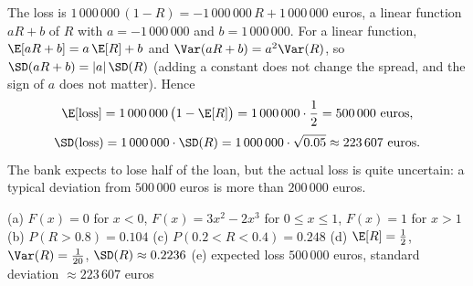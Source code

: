 \begin{solution}
	 The loss is $1\,000\,000\,(1-R)=-1\,000\,000\,R+1\,000\,000$
	euros, a linear function $aR+b$ of $R$ with $a=-1\,000\,000$ and
	$b=1\,000\,000$. For a linear function, $\E[aR+b]=a\,\E[R]+b$ and
	$\Var(aR+b)=a^2\Var(R)$, so $\SD(aR+b)=|a|\,\SD(R)$ (adding a constant does
	not change the spread, and the sign of $a$ does not matter). Hence
	\[
		\E[\text{loss}]=1\,000\,000\,\bigl(1-\E[R]\bigr)=1\,000\,000\cdot\frac12
		=500\,000 \text{ euros},
	\]
	\[
		\SD(\text{loss})=1\,000\,000\cdot\SD(R)=1\,000\,000\cdot\sqrt{0.05}
		\approx223\,607 \text{ euros}.
	\]
	The bank expects to lose half of the loan, but the actual loss is quite
	uncertain: a typical deviation from $500\,000$ euros is more than
	$200\,000$ euros.

	\begin{answer}
		(a) $F(x)=0$ for $x<0$, $F(x)=3x^2-2x^3$ for $0\le x\le1$, $F(x)=1$
		for $x>1$ \quad
		(b) $P(R>0.8)=0.104$ \quad
		(c) $P(0.2<R<0.4)=0.248$ \quad
		(d) $\E[R]=\frac12$, $\Var(R)=\frac1{20}$, $\SD(R)\approx0.2236$ \quad
		(e) expected loss $500\,000$ euros, standard deviation
		$\approx223\,607$ euros
	\end{answer}
\end{solution}
